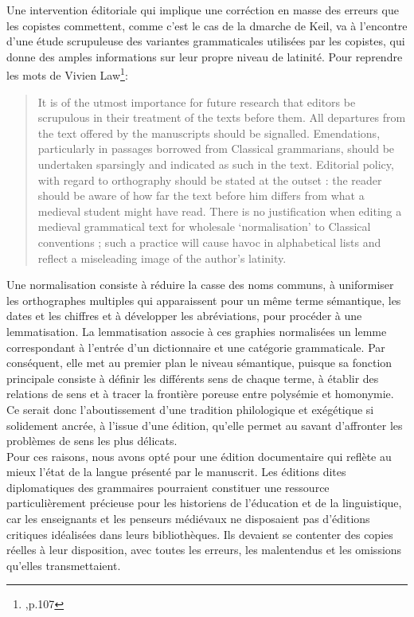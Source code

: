 \documentclass[a4paper, twoside, 12pt]{book}
\begin{document}
Une intervention éditoriale qui implique une corréction en masse des \og{} erreurs \fg{} que les copistes commettent, comme c'est le cas de la dmarche de Keil, va à l'encontre d'une étude scrupuleuse des variantes grammaticales utilisées par les copistes, qui donne des amples informations sur leur propre niveau de latinité. Pour reprendre les mots de Vivien Law\footnote{\cite{law1982insular},p.107}: 

\blockquote{It is of the utmost importance for future research that editors be scrupulous in their treatment of the texts before them. All departures from the text offered by the manuscripts should be signalled. Emendations, particularly in passages borrowed from Classical grammarians, should be undertaken sparsingly and indicated as such in the text. Editorial policy, with regard to orthography should be stated at the outset : the reader should be aware of how far the text before him differs from what a medieval student might have read. There is no justification when editing a medieval grammatical text for wholesale ‘normalisation’ to Classical conventions ; such a practice will cause havoc in alphabetical lists and reflect a miseleading image of the author’s latinity.} 

Une normalisation consiste à réduire la casse des noms communs, à uniformiser les orthographes multiples qui apparaissent pour un même terme sémantique, les dates et les chiffres et à développer les abréviations, pour procéder à une lemmatisation. La lemmatisation associe à ces graphies normalisées un lemme correspondant à l'entrée d'un dictionnaire et une catégorie grammaticale. Par conséquent, elle met au premier plan le niveau sémantique, puisque sa fonction principale consiste à définir les différents sens de chaque terme, à établir des relations de sens et à tracer la frontière poreuse entre polysémie et homonymie. Ce serait donc l'aboutissement d'une tradition philologique et exégétique si solidement ancrée, à l'issue d'une édition, qu'elle permet au savant d'affronter les problèmes de sens les plus délicats.\\

Pour ces raisons, nous avons opté pour une édition documentaire qui reflète au mieux l'état de la langue présenté par le manuscrit. Les éditions dites diplomatiques des grammaires pourraient constituer une ressource particulièrement précieuse pour les historiens de l'éducation et de la linguistique, car les enseignants et les penseurs médiévaux ne disposaient pas d'éditions critiques idéalisées dans leurs bibliothèques. Ils devaient se contenter des copies réelles à leur disposition, avec toutes les erreurs, les malentendus et les omissions qu'elles transmettaient. \\
\end{document}
